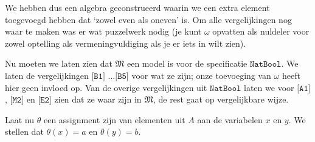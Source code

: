 \documentclass[a4paper,11pt]{article}
\begin{document}
We hebben dus een algebra geconstrueerd waarin we een extra element toegevoegd
hebben dat `zowel even als oneven' is. Om alle vergelijkingen nog waar te
maken was er wat puzzelwerk nodig (je kunt $\omega$ opvatten als nuldeler voor
zowel optelling als vermeningvuldiging als je er iets in wilt zien).

Nu moeten we laten zien dat $\mathfrak{M}$ een model is voor de specificatie
$\texttt{NatBool}$. We laten de vergelijkingen $\texttt{[B1] \ldots [B5]}$
voor wat ze zijn; onze toevoeging van $\omega$ heeft hier geen invloed
op. Van de overige vergelijkingen uit $\texttt{NatBool}$ laten we voor
$\texttt{[A1]}$, $\texttt{[M2]}$ en $\texttt{[E2]}$ zien dat ze waar zijn in
$\mathfrak{M}$, de rest gaat op vergelijkbare wijze.

Laat nu $\theta$ een assignment zijn van elementen uit $A$ aan de variabelen
$x$ en $y$. We stellen dat $\theta(x) = a$ en $\theta(y) = b$.
\end{document}
